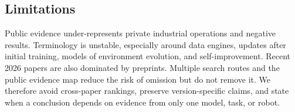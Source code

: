 \subsection{Limitations}

Public evidence under-represents private industrial operations and negative results.
Terminology is unstable, especially around data engines, updates after initial training, models of environment evolution, and self-improvement.
Recent 2026 papers are also dominated by preprints.
Multiple search routes and the public evidence map reduce the risk of omission but do not remove it.
We therefore avoid cross-paper rankings, preserve version-specific claims, and state when a conclusion depends on evidence from only one model, task, or robot.
